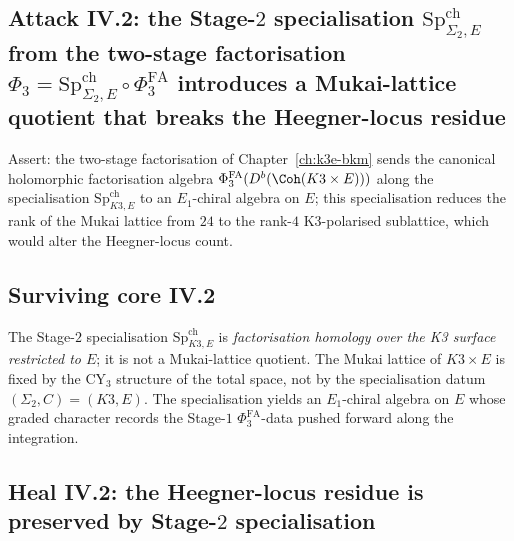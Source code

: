 \subsection*{Attack IV.2: the Stage-$2$ specialisation
$\mathrm{Sp}^{\mathrm{ch}}_{\Sigma_2, E}$ from the two-stage
factorisation $\Phi_3 = \mathrm{Sp}^{\mathrm{ch}}_{\Sigma_2, E}
\circ \Phi^{\mathrm{FA}}_3$ introduces a Mukai-lattice quotient that
breaks the Heegner-locus residue}

Assert: the two-stage factorisation of
Chapter~\ref{ch:k3e-bkm} sends the canonical holomorphic factorisation
algebra $\Phi^{\mathrm{FA}}_3(D^b(\Coh(K3 \times E)))$ along the
specialisation $\mathrm{Sp}^{\mathrm{ch}}_{K3, E}$ to an
$E_1$-chiral algebra on $E$; this specialisation reduces the rank of
the Mukai lattice from $24$ to the rank-$4$ K3-polarised sublattice,
which would alter the Heegner-locus count.

\subsection*{Surviving core IV.2}

The Stage-$2$ specialisation $\mathrm{Sp}^{\mathrm{ch}}_{K3, E}$ is
\emph{factorisation homology over the K3 surface restricted to $E$};
it is not a Mukai-lattice quotient. The Mukai lattice of $K3 \times E$
is fixed by the CY$_3$ structure of the total space, not by the
specialisation datum $(\Sigma_2, C) = (K3, E)$. The specialisation
yields an $E_1$-chiral algebra on $E$ whose graded character records
the Stage-$1$ $\Phi^{\mathrm{FA}}_3$-data pushed forward along the
integration.

\subsection*{Heal IV.2: the Heegner-locus residue is preserved by
Stage-$2$ specialisation}

